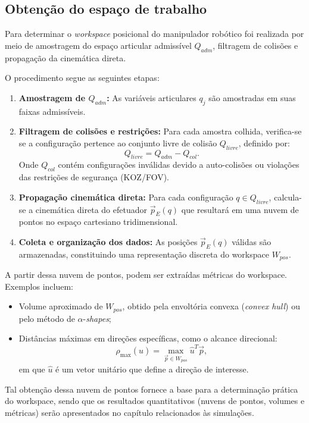 \subsection{Obtenção do espaço de trabalho}

Para determinar o \emph{workspace} posicional do manipulador robótico foi realizada por meio de amostragem do espaço articular admissível $Q_{adm}$, filtragem de colisões e propagação da cinemática direta.

O procedimento segue as seguintes etapas:
\begin{enumerate}
    \item \textbf{Amostragem de $Q_{adm}$:}  
    As variáveis articulares $q_j$ são amostradas em suas faixas admissíveis.

    \item \textbf{Filtragem de colisões e restrições:}  
    Para cada amostra colhida, verifica-se se a configuração pertence ao conjunto livre de colisão $Q_{livre}$, definido por:
    \begin{equation}
        Q_{livre} = Q_{adm} - Q_{col}.
    \end{equation}
    Onde $Q_{col}$ contém configurações inválidas devido a auto-colisões ou violações das restrições de segurança (KOZ/FOV).

    \item \textbf{Propagação cinemática direta:}  
    Para cada configuração $q \in Q_{livre}$, calcula-se a cinemática direta do efetuador $\vec{p}_E(q)$ que resultará em uma nuvem de pontos no espaço cartesiano tridimensional.

    \item \textbf{Coleta e organização dos dados:}  
    As posições $\vec{p}_E(q)$ válidas são armazenadas, constituindo uma representação discreta do workspace $W_{pos}$.
\end{enumerate}

A partir dessa nuvem de pontos, podem ser extraídas métricas do workspace. Exemplos incluem:
\begin{itemize}
    \item Volume aproximado de $W_{pos}$, obtido pela envoltória convexa (\emph{convex hull}) ou pelo método de $\alpha$-\emph{shapes};
    \item Distâncias máximas em direções específicas, como o alcance direcional:
    \begin{equation}
        \rho_{\max}(\hat{u}) = \max_{\vec{p} \in W_{pos}} \hat{u}^T \vec{p},
    \end{equation}
    em que $\hat{u}$ é um vetor unitário que define a direção de interesse.
\end{itemize}

Tal obtenção dessa nuvem de pontos fornece a base para a determinação prática do workspace, sendo que os resultados quantitativos (nuvens de pontos, volumes e métricas) serão apresentados no capítulo relacionados às simulações.
